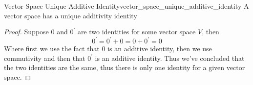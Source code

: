 \begin{proposition}{Vector Space Unique Additive
Identity}{vector_space_unique_additive_identity}
A vector space has a unique additivity identity
\end{proposition}
\begin{proof}
    Suppose \( 0 \) and \( 0 ^{ \prime  }  \) are two identities for
    some vector space \( V \), then 
    \[
    0 ^{ \prime  } =  0 ^{ \prime  } +  0 = 0 +  0 ^{ \prime  } = 0
    \]
    Where first we use the fact that \( 0 \) is an additive identity, then we
    use commutivity and then that \( 0 ^{ \prime  }  \) is an additive identity.
    Thus we've concluded that the two identities are the same, thus there is
    only one identity for a given vector space.
\end{proof}
